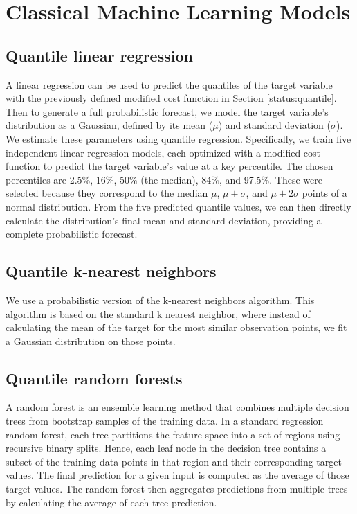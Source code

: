 \documentclass[12pt,a4paper]{book}
\begin{document}
\section{Classical Machine Learning Models} 

\subsection{Quantile linear regression} 
\label{model:qlr}
A linear regression can be used to predict the 
quantiles of the target variable with the previously defined modified cost function in Section \ref{status:quantile}. Then to generate a full probabilistic forecast, we model the target variable's distribution as a Gaussian, defined by its mean ($\mu$) and standard deviation ($\sigma$). We estimate these parameters using quantile regression. Specifically, we train five independent linear regression models, each optimized with a modified cost function to predict the target variable's value at a key percentile. The chosen percentiles are 2.5\%, 16\%, 50\% (the median), 84\%, and 97.5\%. These were selected because they correspond to the median $\mu$, $\mu\pm\sigma$, and $\mu\pm2\sigma$ points of a normal distribution. From the five predicted quantile values, we can then directly calculate the distribution's final mean and standard deviation, providing a complete probabilistic forecast.

\subsection{Quantile k‑nearest neighbors} 
We use a probabilistic version of the k-nearest neighbors algorithm. This algorithm is based on the standard k nearest neighbor, where instead of calculating the mean of the target for the most similar observation points, we fit a Gaussian distribution on those points.

\subsection{Quantile random forests} 
A random forest is an ensemble learning method that combines multiple decision trees from bootstrap samples of the training data. In a standard regression random forest, each tree partitions the feature space into a set of regions using recursive binary splits. Hence, each leaf node in the decision tree contains a subset of the training data points in that region and their corresponding target values. The final prediction for a given input is computed as the average of those target values. The random forest then aggregates predictions from multiple trees by calculating the average of each tree prediction.
\end{document}
